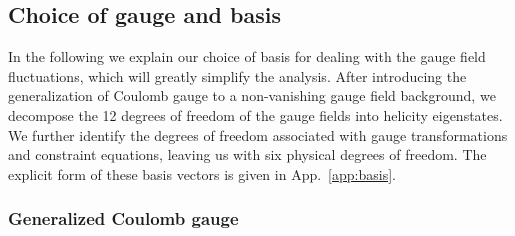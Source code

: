 \subsection{Choice of gauge and basis \label{GaugeAndBasis}}

In the following we explain our choice of basis for dealing with the gauge field fluctuations, which will greatly simplify the analysis. After introducing the generalization of Coulomb gauge to a non-vanishing gauge field background, we decompose the 12 degrees of freedom of the gauge fields into helicity eigenstates. We further identify the degrees of freedom associated with gauge transformations and constraint equations, leaving us with six physical degrees of freedom. The explicit form of these basis vectors is given in App.~\ref{app:basis}.


\subsubsection{Generalized Coulomb gauge}
\label{sec:GCG}

